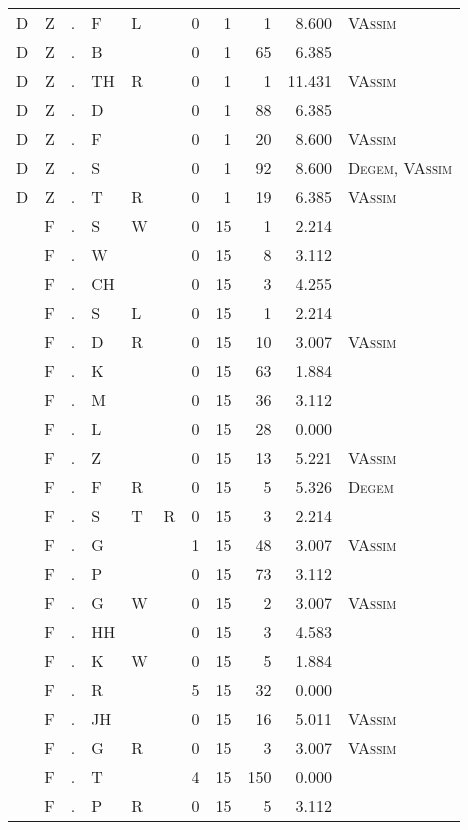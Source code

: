 \begin{longtable}{r@{ } r@{ } c@{ } l@{ } l@{ } l@{ } r r r r l }
D & Z & . & F & L &  & 0 & 1 & 1 & 8.600 & \textsc{VAssim} \\
D & Z & . & B &  &  & 0 & 1 & 65 & 6.385 &  \\
D & Z & . & TH & R &  & 0 & 1 & 1 & 11.431 & \textsc{VAssim} \\
D & Z & . & D &  &  & 0 & 1 & 88 & 6.385 &  \\
D & Z & . & F &  &  & 0 & 1 & 20 & 8.600 & \textsc{VAssim} \\
D & Z & . & S &  &  & 0 & 1 & 92 & 8.600 & \textsc{Degem}, \textsc{VAssim} \\
D & Z & . & T & R &  & 0 & 1 & 19 & 6.385 & \textsc{VAssim} \\
 & F & . & S & W &  & 0 & 15 & 1 & 2.214 &  \\
 & F & . & W &  &  & 0 & 15 & 8 & 3.112 &  \\
 & F & . & CH &  &  & 0 & 15 & 3 & 4.255 &  \\
 & F & . & S & L &  & 0 & 15 & 1 & 2.214 &  \\
 & F & . & D & R &  & 0 & 15 & 10 & 3.007 & \textsc{VAssim} \\
 & F & . & K &  &  & 0 & 15 & 63 & 1.884 &  \\
 & F & . & M &  &  & 0 & 15 & 36 & 3.112 &  \\
 & F & . & L &  &  & 0 & 15 & 28 & 0.000 &  \\
 & F & . & Z &  &  & 0 & 15 & 13 & 5.221 & \textsc{VAssim} \\
 & F & . & F & R &  & 0 & 15 & 5 & 5.326 & \textsc{Degem} \\
 & F & . & S & T & R & 0 & 15 & 3 & 2.214 &  \\
 & F & . & G &  &  & 1 & 15 & 48 & 3.007 & \textsc{VAssim} \\
 & F & . & P &  &  & 0 & 15 & 73 & 3.112 &  \\
 & F & . & G & W &  & 0 & 15 & 2 & 3.007 & \textsc{VAssim} \\
 & F & . & HH &  &  & 0 & 15 & 3 & 4.583 &  \\
 & F & . & K & W &  & 0 & 15 & 5 & 1.884 &  \\
 & F & . & R &  &  & 5 & 15 & 32 & 0.000 &  \\
 & F & . & JH &  &  & 0 & 15 & 16 & 5.011 & \textsc{VAssim} \\
 & F & . & G & R &  & 0 & 15 & 3 & 3.007 & \textsc{VAssim} \\
 & F & . & T &  &  & 4 & 15 & 150 & 0.000 &  \\
 & F & . & P & R &  & 0 & 15 & 5 & 3.112 &  \\

\end{longtable}
